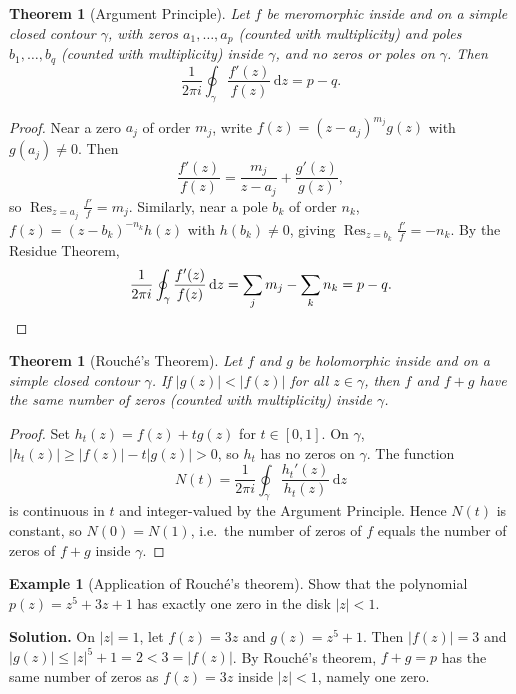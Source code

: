 \documentclass[12pt,a4paper,openany]{book}
\theoremstyle{definition}
\newtheorem{example}[definition]{Example}
\theoremstyle{plain}
\newtheorem{theorem}[definition]{Theorem}
\theoremstyle{remark}
\DeclareMathOperator{\Res}{Res}
\newcommand{\dd}{\mathrm{d}}
\newcommand{\abs}[1]{\left|#1\right|}
\begin{document}
\begin{theorem}[Argument Principle]\label{thm:argument-principle}
Let $f$ be meromorphic inside and on a simple closed contour $\gamma$,
with zeros $a_1,\dots,a_p$ (counted with multiplicity) and poles
$b_1,\dots,b_q$ (counted with multiplicity) inside $\gamma$, and no
zeros or poles on $\gamma$.  Then
\[
  \frac{1}{2\pi i}\oint_{\gamma}\frac{f'(z)}{f(z)}\,\dd z
  = p - q.
\]
\end{theorem}

\begin{proof}
Near a zero $a_j$ of order $m_j$, write $f(z)=(z-a_j)^{m_j}g(z)$ with
$g(a_j)\neq 0$.  Then
\[
  \frac{f'(z)}{f(z)}=\frac{m_j}{z-a_j}+\frac{g'(z)}{g(z)},
\]
so $\Res_{z=a_j}\frac{f'}{f}=m_j$.  Similarly, near a pole $b_k$ of
order $n_k$, $f(z)=(z-b_k)^{-n_k}h(z)$ with $h(b_k)\neq 0$, giving
$\Res_{z=b_k}\frac{f'}{f}=-n_k$.  By the Residue Theorem,
\[
  \frac{1}{2\pi i}\oint_{\gamma}\frac{f'(z)}{f(z)}\,\dd z
  =\sum_j m_j - \sum_k n_k = p - q. \qedhere
\]
\end{proof}

\begin{theorem}[Rouch\'e's Theorem]\label{thm:rouche}
Let $f$ and $g$ be holomorphic inside and on a simple closed contour
$\gamma$.  If $\abs{g(z)}<\abs{f(z)}$ for all $z\in\gamma$, then $f$
and $f+g$ have the same number of zeros (counted with multiplicity)
inside $\gamma$.
\end{theorem}

\begin{proof}
Set $h_t(z)=f(z)+tg(z)$ for $t\in[0,1]$.  On $\gamma$,
$\abs{h_t(z)}\geq\abs{f(z)}-t\abs{g(z)}>0$, so $h_t$ has no zeros on
$\gamma$.  The function
\[
  N(t)=\frac{1}{2\pi i}\oint_{\gamma}\frac{h_t'(z)}{h_t(z)}\,\dd z
\]
is continuous in $t$ and integer-valued by the Argument Principle.
Hence $N(t)$ is constant, so $N(0)=N(1)$, i.e.\ the number of zeros
of $f$ equals the number of zeros of $f+g$ inside $\gamma$.
\end{proof}

\begin{example}[Application of Rouch\'e's theorem]\label{ex:rouche}
Show that the polynomial $p(z)=z^5+3z+1$ has exactly one zero in the
disk $\abs{z}<1$.

\medskip\noindent\textbf{Solution.}
On $\abs{z}=1$, let $f(z)=3z$ and $g(z)=z^5+1$.  Then $\abs{f(z)}=3$
and $\abs{g(z)}\leq\abs{z}^5+1=2<3=\abs{f(z)}$.  By Rouch\'e's theorem,
$f+g=p$ has the same number of zeros as $f(z)=3z$ inside $\abs{z}<1$,
namely one zero.
\end{example}
\end{document}

